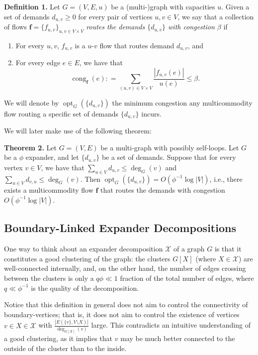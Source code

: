 \documentclass[a4paper,11pt]{article}
\newcommand{\coloneqq}{\mathrel{\mathop:}=}
\DeclareMathOperator{\opt}{opt}
\DeclareMathOperator{\congestion}{cong}
\DeclareMathOperator{\degG}{deg}
\renewcommand{\deg}{\degG} %
\begin{document}
\textbf{Definition 1.} Let \(G = (V, E, u)\) be a (multi-)graph with capacities \(u\). Given a set of demands \(d_{u,v}\geq 0\) for every pair of vertices \(u,v\in V\), we say that a collection of flows \(\pmb{f} = \{f_{u,v}\}_{u,v\in V\times V}\) \emph{routes the demands \(\{d_{u,v}\}\) with congestion \(\beta\)} if
\begin{enumerate}[label=(\arabic*)]
    \item For every \(u,v\), \(f_{u,v}\) is a \(u\)-\(v\) flow that routes demand \(d_{u,v}\), and
    \item For every edge \(e\in E\), we have that
    \[
        \congestion_{\pmb{f}}(e)\coloneqq \sum_{(u,v)\in V\times V}\frac{|f_{u,v}(e)|}{u(e)}\leq \beta .
    \]
\end{enumerate}

We will denote by \(\opt_G(\{d_{u,v}\})\) the minimum congestion any multicommodity flow routing a specific set of demands \(\{d_{u,v}\}\) incurs.

We will later make use of the following theorem:

\textbf{Theorem 2.} Let \(G = (V,E)\) be a multi-graph with possibly self-loops. Let \(G\) be a \(\phi\) expander, and let \(\{d_{u,v}\}\) be a set of demands. Suppose that for every vertex \(v\in V\), we have that \(\sum_{u\in V}d_{u,v}\leq \deg_G(v)\) and \(\sum_{u\in V}d_{v,u}\leq \deg_G(v)\). Then \(\opt_G(\{d_{u,v}\}) = O(\phi^{-1}\log |V|)\), i.e., there exists a multicommodity flow \(\pmb{f}\) that routes the demands with congestion \(O(\phi^{-1}\log |V|)\).

\subsection*{Boundary-Linked Expander Decompositions}
One way to think about an expander decomposition \(\mathcal{X}\) of a graph \(G\) is that it constitutes a good clustering of the graph: the clusters \(G[X]\) (where \(X\in \mathcal{X}\)) are well-connected internally, and, on the other hand, the number of edges crossing between the clusters is only a \(q\phi \ll 1\) fraction of the total number of edges, where \(q \ll \phi^{-1}\) is the quality of the decomposition.

Notice that this definition in general does not aim to control the connectivity of boundary-vertices; that is, it does not aim to control the existence of vertices \(v\in X\in \mathcal{X}\) with \(\frac{|E(\{v\},V\setminus X)|}{\deg_{G[X]}(v)}\) large. This contradicts an intuitive understanding of a good clustering, as it implies that \(v\) may be much better connected to the outside of the cluster than to the inside.
\end{document}
